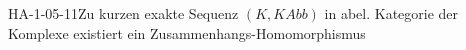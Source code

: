 
\begin{THEO}{HA-1-05-11}{Zu kurzen exakte Sequenz $(K,KAbb)$ in abel. Kategorie der Komplexe existiert ein Zusammenhangs-Homomorphismus}
\end{THEO}

